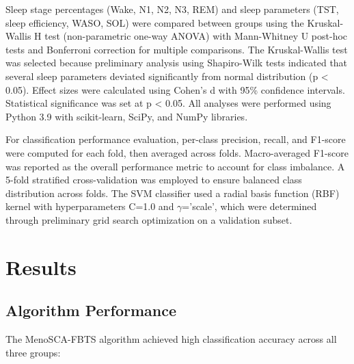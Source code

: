 \documentclass[ASNA,twocolumn]{USG}
\begin{document}
Sleep stage percentages (Wake, N1, N2, N3, REM) and sleep parameters (TST, sleep efficiency, WASO, SOL) were compared between groups using the Kruskal-Wallis H test (non-parametric one-way ANOVA) with Mann-Whitney U post-hoc tests and Bonferroni correction for multiple comparisons. The Kruskal-Wallis test was selected because preliminary analysis using Shapiro-Wilk tests indicated that several sleep parameters deviated significantly from normal distribution (p < 0.05). Effect sizes were calculated using Cohen's d with 95\% confidence intervals. Statistical significance was set at p < 0.05. All analyses were performed using Python 3.9 with scikit-learn, SciPy, and NumPy libraries.

For classification performance evaluation, per-class precision, recall, and F1-score were computed for each fold, then averaged across folds. Macro-averaged F1-score was reported as the overall performance metric to account for class imbalance. A 5-fold stratified cross-validation was employed to ensure balanced class distribution across folds. The SVM classifier used a radial basis function (RBF) kernel with hyperparameters C=1.0 and $\gamma$='scale', which were determined through preliminary grid search optimization on a validation subset.

\section{Results}\label{sec3}

\subsection{Algorithm Performance}

The MenoSCA-FBTS algorithm achieved high classification accuracy across all three groups:
\end{document}
